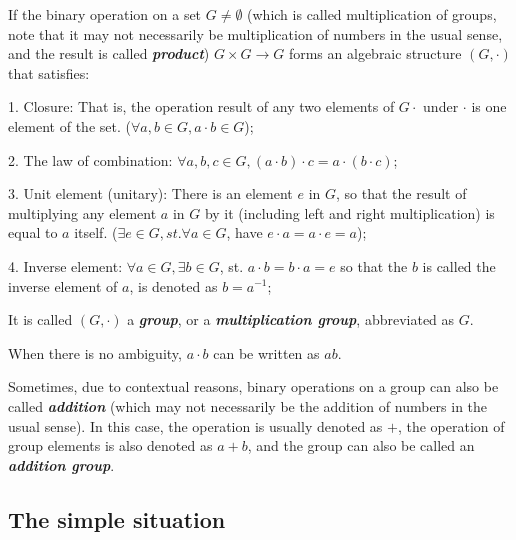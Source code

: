 \documentclass[
  manuscript=article,  %
  layout=preprint,  %
  year=20xx,
  volume=x,
]{extra/joas}
\begin{document}
If the binary operation on a set  $G \neq\emptyset$
(which is called multiplication of groups, note that it may not necessarily
 be multiplication of numbers in the usual sense, and the result is called \textbf{\emph{product}})
$G\times G \to G$ forms an algebraic structure $(G, \cdot)$ that satisfies:


1. Closure: That is, the operation result of any two elements of $G\cdot$ under $\cdot$ is one element of the set. 
($\forall a, b\in G, a\cdot b \in G$);

2. The law of combination: $\forall a, b, c\in G, (a\cdot b)\cdot c = a\cdot (b\cdot c) $;

3. Unit element (unitary): There is an element $e$ in $G$, so that the result of multiplying any element $a$ in $G$ by 
it (including left and right multiplication) is equal to $a$ itself. 
($\exists e\in G, st. \forall a\in G$, have $ e\cdot a = a\cdot e = a $);

4. Inverse element: $\forall a \in G, \exists b\in G$, st. $a\cdot b = b\cdot a = e$ 
so that the $b$ is called the inverse element of $a$, is denoted as $b=a^{-1}$;

It is called $(G, \cdot)$ a \textbf{\emph{group}}, or a \textbf{\emph{multiplication group}}, abbreviated as $G$.

When there is no ambiguity, $a · b$ can be written as $ab$.

Sometimes, due to contextual reasons, binary operations on a group can also be called \textbf{\emph{addition}} 
(which may not necessarily be the addition of numbers in the usual sense). 
In this case, the operation is usually denoted as $+$, 
the operation of group elements is also denoted as $a + b$, and the group can also be called an \textbf{\emph{addition group}}.



\subsection{The simple situation}
\end{document}
